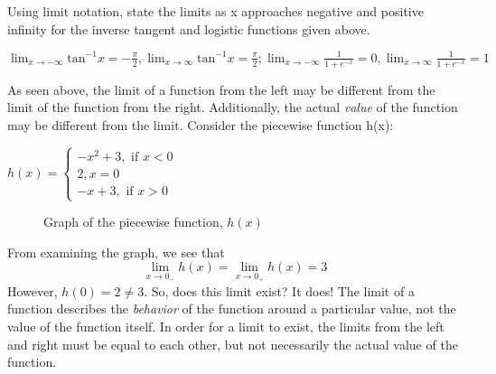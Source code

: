 \begin{Exercise}[title=Limits Practice 3, label=limits3]
Using limit notation, state the limits as x approaches negative and positive 
infinity for the inverse tangent and logistic functions given above.
  \vspace{40mm}
\end{Exercise}
\begin{Answer}[ref=limits3] 
	$ \lim_{x \rightarrow -\infty} \text{tan}^{-1}x = -\frac{\pi}{2}, \lim_{x 
	\rightarrow \infty} \text{tan}^{-1}x = \frac{\pi}{2}; \lim_{x \rightarrow 
	-\infty} \frac{1}{1 + e^{-x}} = 0, \lim_{x \rightarrow \infty} \frac{1}{1 + 
	e^{-x}} = 1 $
\end{Answer}


As seen above, the limit of a function from the left may be different from the 
limit of the function from the right. Additionally, the actual \textit{value} of 
the function may be different from the limit. Consider the piecewise function h(x):

$h(x) = \begin{cases}
    -x^2+3, \text{ if } x < 0\\
    2, x=0\\
    -x+3, \text{ if } x > 0
\end{cases}$

\begin{figure}[htbp]
\centering
{}
\caption{Graph of the piecewise function, $h(x)$}
\end{figure}


From examining the graph, we see that $$\lim_{x\to0_-}h(x) = \lim_{x\to0_+}h(x) = 3$$
However, $h(0) = 2 \neq 3$. So, does this limit exist? It does! The limit of a 
function describes the \textit{behavior} of the function around a particular value, 
not the value of the function itself. In order for a limit to exist, the limits 
from the left and right must be equal to each other, but not necessarily the actual 
value of the function. 


